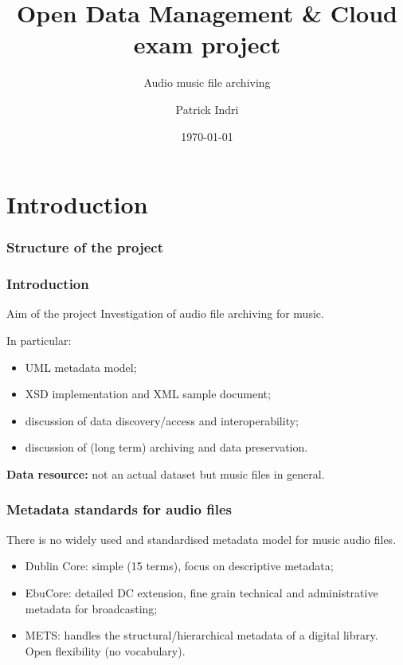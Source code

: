 \documentclass{beamer}
\title{Open Data Management \& Cloud\\exam project}
\subtitle{Audio music file archiving}
\author{Patrick Indri}
\date{\today}
\newcommand\rb[1]{\textcolor{ThemeRed}{\textbf{#1}}}
\begin{document}
	\setcounter{showSlideNumbers}{0}

	\frame{\titlepage}

	\setcounter{framenumber}{0}
	\setcounter{showSlideNumbers}{1}



\section{Introduction}

  \begin{frame}
    \frametitle{Structure of the project}
  \end{frame}



  \begin{frame}
    \frametitle{Introduction}

    \begin{block}{Aim of the project}
      Investigation of audio file archiving for music.
    \end{block}

    \vspace{1em}

    In particular:
    \begin{itemize}
      \item UML metadata model;
      \item XSD implementation and XML sample document;
      \item discussion of data discovery/access and interoperability;
      \item discussion of (long term) archiving and data preservation.
    \end{itemize}

    \vspace{1em}

    \rb{Data resource:} not an actual dataset but music files in general.

  \end{frame}



  \begin{frame}
    \frametitle{Metadata standards for audio files}

    There is no widely used and standardised metadata model for music audio files.

    \vspace{1em}

    \begin{itemize}
      \itemsep1em
      \item Dublin Core: simple (15 terms), focus on descriptive metadata;
      \item EbuCore: detailed DC extension, fine grain technical and administrative metadata for broadcasting;
      \item METS: handles the structural/hierarchical metadata of a digital library. Open flexibility (no vocabulary).
    \end{itemize}
  \end{frame}
\end{document}
